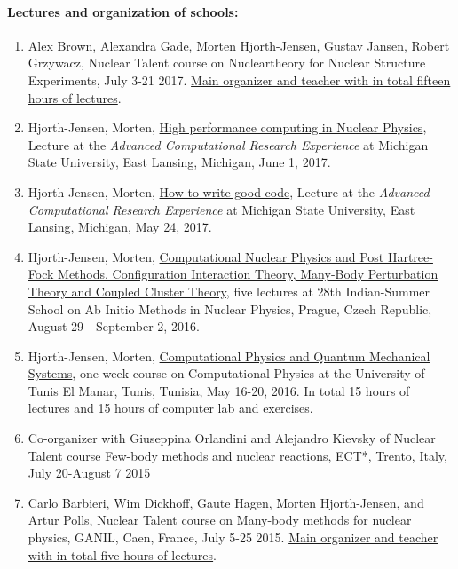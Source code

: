 \documentclass[a4wide,10pt]{article}
\begin{document}
\paragraph{Lectures and organization of schools:}
\begin{enumerate}
\item Alex Brown, Alexandra Gade, Morten Hjorth-Jensen, Gustav Jansen, Robert Grzywacz, Nuclear Talent course on Nucleartheory for Nuclear Structure Experiments, July 3-21 2017. \href{{https://github.com/NuclearTalent/NuclearStructure}}{Main organizer and teacher with in total fifteen hours of lectures}. 

\item Hjorth-Jensen, Morten, \href{{https://icer-acres.msu.edu/summer-2017/schedule/}}{High performance computing in Nuclear Physics}, Lecture at the \emph{Advanced Computational Research Experience} at Michigan State University, East Lansing, Michigan, June 1, 2017.

\item Hjorth-Jensen, Morten, \href{{https://icer-acres.msu.edu/summer-2017/schedule/}}{How to write good code}, Lecture at the \emph{Advanced Computational Research Experience} at Michigan State University, East Lansing, Michigan, May 24, 2017.

\item Hjorth-Jensen, Morten, \href{{http://rafael.ujf.cas.cz/school}}{Computational Nuclear Physics and Post Hartree-Fock Methods. Configuration Interaction Theory, Many-Body Perturbation Theory and Coupled Cluster Theory}, five lectures at 28th Indian-Summer School on Ab Initio Methods in Nuclear Physics, Prague, Czech Republic, August 29 - September 2, 2016.

\item Hjorth-Jensen, Morten, \href{{http://compphysics.github.io/CompPhysUTunis/doc/web/course.html}}{Computational Physics and Quantum Mechanical Systems}, one week course on Computational Physics at the University of Tunis El Manar, Tunis, Tunisia, May 16-20, 2016. In total 15 hours of lectures and 15 hours of computer lab and exercises. 

\item Co-organizer with Giuseppina Orlandini and Alejandro Kievsky of Nuclear Talent course \href{{https://groups.nscl.msu.edu/jina/talent/wiki/Course_3}}{Few-body methods and nuclear reactions}, ECT*, Trento, Italy, July 20-August 7 2015

\item Carlo Barbieri, Wim Dickhoff, Gaute Hagen, Morten Hjorth-Jensen, and Artur Polls, Nuclear Talent course on Many-body methods for nuclear physics, GANIL, Caen, France, July 5-25 2015. \href{{http://nucleartalent.github.io/Course2ManyBodyMethods/doc/web/course.html}}{Main organizer and teacher with in total five hours of lectures}. 


\end{enumerate}
\end{document}
